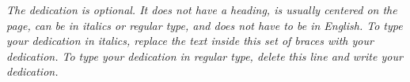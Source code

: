 

\vspace*{\fill}
\begin{flushleft}
\textit{The dedication is optional. It does not have a heading, is usually centered on the page, can be
in italics or regular type, and does not have to be in English. To type your dedication in italics, replace the text inside this set of braces with your dedication. To type your dedication in regular type, delete this line and write your dedication.}
\end{flushleft}
\vspace*{\fill}
\clearpage


